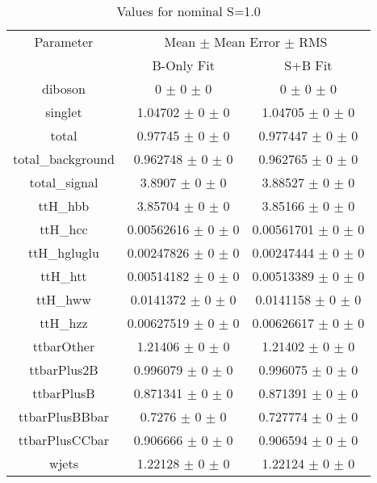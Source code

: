 \begin{table}
\centering
\caption{Values for nominal S=1.0}
\begin{tabular}{ccc}
\toprule
Parameter 	& \multicolumn{2}{c}{Mean $\pm$ Mean Error $\pm$ RMS}\\
 	& B-Only Fit & S+B Fit\\
\midrule
diboson 	& \num{0} $\pm$ \num{0} $\pm$ \num{0} 	& \num{0} $\pm$ \num{0} $\pm$ \num{0}\\
singlet 	& \num{1.04702} $\pm$ \num{0} $\pm$ \num{0} 	& \num{1.04705} $\pm$ \num{0} $\pm$ \num{0}\\
total 	& \num{0.97745} $\pm$ \num{0} $\pm$ \num{0} 	& \num{0.977447} $\pm$ \num{0} $\pm$ \num{0}\\
total\_background 	& \num{0.962748} $\pm$ \num{0} $\pm$ \num{0} 	& \num{0.962765} $\pm$ \num{0} $\pm$ \num{0}\\
total\_signal 	& \num{3.8907} $\pm$ \num{0} $\pm$ \num{0} 	& \num{3.88527} $\pm$ \num{0} $\pm$ \num{0}\\
ttH\_hbb 	& \num{3.85704} $\pm$ \num{0} $\pm$ \num{0} 	& \num{3.85166} $\pm$ \num{0} $\pm$ \num{0}\\
ttH\_hcc 	& \num{0.00562616} $\pm$ \num{0} $\pm$ \num{0} 	& \num{0.00561701} $\pm$ \num{0} $\pm$ \num{0}\\
ttH\_hgluglu 	& \num{0.00247826} $\pm$ \num{0} $\pm$ \num{0} 	& \num{0.00247444} $\pm$ \num{0} $\pm$ \num{0}\\
ttH\_htt 	& \num{0.00514182} $\pm$ \num{0} $\pm$ \num{0} 	& \num{0.00513389} $\pm$ \num{0} $\pm$ \num{0}\\
ttH\_hww 	& \num{0.0141372} $\pm$ \num{0} $\pm$ \num{0} 	& \num{0.0141158} $\pm$ \num{0} $\pm$ \num{0}\\
ttH\_hzz 	& \num{0.00627519} $\pm$ \num{0} $\pm$ \num{0} 	& \num{0.00626617} $\pm$ \num{0} $\pm$ \num{0}\\
ttbarOther 	& \num{1.21406} $\pm$ \num{0} $\pm$ \num{0} 	& \num{1.21402} $\pm$ \num{0} $\pm$ \num{0}\\
ttbarPlus2B 	& \num{0.996079} $\pm$ \num{0} $\pm$ \num{0} 	& \num{0.996075} $\pm$ \num{0} $\pm$ \num{0}\\
ttbarPlusB 	& \num{0.871341} $\pm$ \num{0} $\pm$ \num{0} 	& \num{0.871391} $\pm$ \num{0} $\pm$ \num{0}\\
ttbarPlusBBbar 	& \num{0.7276} $\pm$ \num{0} $\pm$ \num{0} 	& \num{0.727774} $\pm$ \num{0} $\pm$ \num{0}\\
ttbarPlusCCbar 	& \num{0.906666} $\pm$ \num{0} $\pm$ \num{0} 	& \num{0.906594} $\pm$ \num{0} $\pm$ \num{0}\\
wjets 	& \num{1.22128} $\pm$ \num{0} $\pm$ \num{0} 	& \num{1.22124} $\pm$ \num{0} $\pm$ \num{0}\\
\bottomrule
\end{tabular}
\end{table}